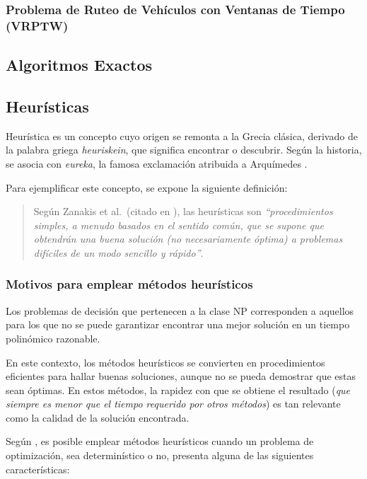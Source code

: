 \documentclass[12pt,titlepage,twoside,openright]{book}
\begin{document}
\subsubsection{Problema de Ruteo de Vehículos con Ventanas de Tiempo (VRPTW)}




\subsection{Algoritmos Exactos}

\subsection{Heurísticas}

Heurística es un concepto cuyo origen se remonta a la Grecia clásica, derivado de la palabra griega \textit{heuriskein}, que significa encontrar o descubrir. Según la historia, se asocia con \textit{eureka}, la famosa exclamación atribuida a Arquímedes \citep{antonioSuarez2014}.

Para ejemplificar este concepto, se expone la siguiente definición:

\begin{quote}
	Según Zanakis et al.\ (citado en \citep{duarte2007metaheuristicas}), las heurísticas son \textit{``procedimientos simples, a menudo basados en el sentido común, que se supone que obtendrán una buena solución (no necesariamente óptima) a problemas difíciles de un modo sencillo y rápido''}.
\end{quote}

\subsubsection{Motivos para emplear métodos heurísticos}

Los problemas de decisión que pertenecen a la clase NP corresponden a aquellos para los que no se puede garantizar encontrar una mejor solución en un tiempo polinómico razonable.

En este contexto, los métodos heurísticos se convierten en procedimientos eficientes para hallar buenas soluciones, aunque no se pueda demostrar que estas sean óptimas. En estos métodos, la rapidez con que se obtiene el resultado (\textit{que siempre es menor que el tiempo requerido por otros métodos}) es tan relevante como la calidad de la solución encontrada.

Según \citep{antonioSuarez2014}, es posible emplear métodos heurísticos cuando un problema de optimización, sea determinístico o no, presenta alguna de las siguientes características:
\end{document}
